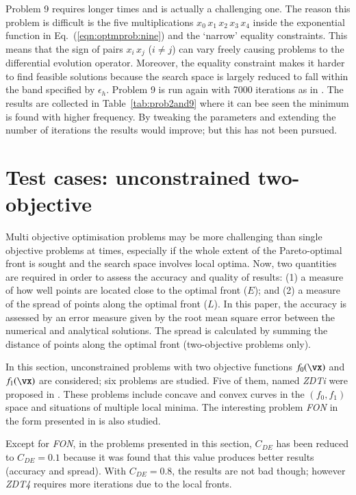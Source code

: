 \documentclass[final,5p,times,twocolumn]{elsarticle}
\newcommand{\eqname}  {Eq.}
\begin{document}
Problem 9 requires longer times and is actually a challenging one. The reason this problem is
difficult is the five multiplications $x_0\,x_1\,x_2\,x_3\,x_4$ inside the exponential function in
\eqname~(\ref{eqn:optmprob:nine}) and the `narrow' equality constraints. This means that the sign of
pairs $x_i\,x_j$ ($i \neq j$) can vary freely causing problems to the differential evolution
operator. Moreover, the equality constraint makes it harder to find feasible solutions because the
search space is largely reduced to fall within the band specified by $\epsilon_h$. Problem 9 is run
again with 7000 iterations as in \citep{deb:00}. The results are collected in
Table~\ref{tab:prob2and9} where it can bee seen the minimum is found with higher frequency. By
tweaking the parameters and extending the number of iterations the results would improve; but this
has not been pursued.



\section{Test cases: unconstrained two-objective}
\label{sec:exMulti}

Multi objective optimisation problems may be more challenging than single objective problems at
times, especially if the whole extent of the Pareto-optimal front is sought and the search space
involves local optima. Now, two quantities are required in order to assess the accuracy and quality
of results: (1) a measure of how well points are located close to the optimal front ($E$); and (2) a
measure of the spread of points along the optimal front ($L$). In this paper, the accuracy is
assessed by an error measure given by the root mean square error between the numerical and
analytical solutions. The spread is calculated by summing the distance of points along the optimal
front (two-objective problems only).

In this section, unconstrained problems with two objective functions $f_0(\vx)$ and $f_1(\vx)$ are
considered; six problems are studied. Five of them, named \emph{ZDTi} were proposed in
\citep{zit:00}. These problems include concave and convex curves in the $(f_0,f_1)$ space and
situations of multiple local minima. The interesting problem \emph{FON} \citep{fonseca:95} in the
form presented in \citep{deb:01a} is also studied.

Except for \emph{FON}, in the problems presented in this section, $C_{DE}$ has been reduced to
$C_{DE}=0.1$ because it was found that this value produces better results (accuracy and spread).
With $C_{DE}=0.8$, the results are not bad though; however \emph{ZDT4} requires more iterations due
to the local fronts.
\end{document}
